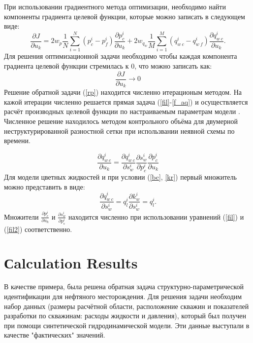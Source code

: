 \documentclass{article}
\begin{document}
При использовании градиентного метода оптимизации, необходимо найти компоненты градиента целевой функции, которые можно записать в следующем виде:
\begin{equation}
\frac{\partial J}{\partial u_k} = 2w_p\frac{1}{N}\sum_{i=1}^N ({p_c^i-p_f^i})\frac{\partial p_c^i}{\partial u_k}+2w_{q_w}\frac{1}{M}\sum_{i=1}^M{\left(q_{w\:c}^i-q_{w\:f}^i\right)}\frac{\partial q_{w\:c}^i}{\partial u_k}.
\end{equation}
Для решения оптимизационной задачи необходимо чтобы каждая компонента градиента целевой функции стремилась к 0, что можно записать как:
\begin{equation} \label{rp}
	 \frac{\partial J}{\partial u_k} \rightarrow 0
\end{equation}
Решение обратной задачи (\ref{rp}) находится численно итерационым методом. На кажой итерации численно решается прямая задача (\ref{fil}-\ref{f_aq}) и осуществляется расчёт производных целевой функции по настраиваемым параметрам модели \cite{opt}. Численное решение находилось методом контрольного объёма  для двумерной неструктурированной разностной сетки при использвании неявной схемы по времени.

\begin{equation}
\frac{\partial q_{w\:c}^i}{\partial u_k} = \frac{\partial q_{w\:c}^i}{\partial s_w^i}\frac{\partial s_w^i}{\partial p_c^i}\frac{\partial p_c^i}{\partial u_k}
\end{equation}
Для модели цветных жидкостей и при условии (\ref{bc}, \ref{kr}) первый множитель можно представить в виде:
\begin{equation}
\frac{\partial q_{w\:c}^i}{\partial s_w^i} = q_l^i\frac{\partial k_{w}^i}{\partial s_w^i} = q_l^i.
\end{equation}
Множители $\frac{\partial p_c^i}{\partial u_k}$ и $\frac{\partial s_w^i}{\partial p_с^i}$ находится численно при использовании уравнений (\ref{fil}) и (\ref{fil2}) соответственно.
\section{Сalculation Results}
В качестве примера, была решена обратная задача структурно-параметрической идентификации для нефтяного месторождения. Для решения задачи необходим набор данных (размеры расчётной области, расположение скважин и показателей разработки по скважинам: расходы жидкости и давления), который был получен при помощи синтетической гидродинамической модели. Эти данные выступали в качестве "фактических" значений. 
\end{document}
